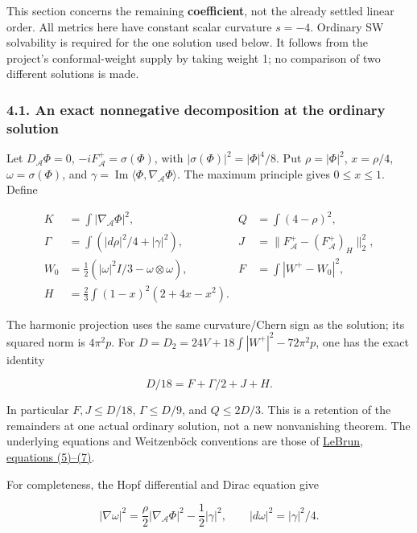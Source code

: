 \documentclass[
  10pt,
]{article}
\begin{document}
This section concerns the remaining \textbf{coefficient}, not the
already settled linear order. All metrics here have constant scalar
curvature \(s=-4\). Ordinary SW solvability is required for the one
solution used below. It follows from the project's conformal-weight
supply by taking weight 1; no comparison of two different solutions is
made.

\hypertarget{an-exact-nonnegative-decomposition-at-the-ordinary-solution}{%
\subsubsection{4.1. An exact nonnegative decomposition at the ordinary
solution}\label{an-exact-nonnegative-decomposition-at-the-ordinary-solution}}

Let \(D_{\mathcal A}\Phi=0\), \(-iF_{\mathcal A}^+=\sigma(\Phi)\), with
\(|\sigma(\Phi)|^2=|\Phi|^4/8\). Put \(\rho=|\Phi|^2\), \(x=\rho/4\),
\(\omega=\sigma(\Phi)\), and
\(\gamma=\operatorname{Im}\langle\Phi,\nabla_{\mathcal A}\Phi\rangle\).
The maximum principle gives \(0\le x\le1\). Define

\[
 \begin{aligned}
 K&=\int|\nabla_{\mathcal A}\Phi|^2,&Q&=\int(4-\rho)^2,\\
 \Gamma&=\int(|d\rho|^2/4+|\gamma|^2),&
 J&=\|F_{\mathcal A}^+-(F_{\mathcal A}^+)_H\|_2^2,\\
 W_0&=\tfrac12(|\omega|^2I/3-\omega\otimes\omega),&
 F&=\int|W^+-W_0|^2,\\
 H&=\tfrac23\int(1-x)^2(2+4x-x^2).&&
 \end{aligned}                                                   \tag{4.1}
\]

The harmonic projection uses the same curvature/Chern sign as the
solution; its squared norm is \(4\pi^2p\). For
\(D=D_2=24V+18\int|W^+|^2-72\pi^2p\), one has the exact identity

\[
                  \boxed{D/18=F+\Gamma/2+J+H.}                  \tag{4.2}
\]

In particular \(F,J\le D/18\), \(\Gamma\le D/9\), and \(Q\le2D/3\). This
is a retention of the remainders at one actual ordinary solution, not a
new nonvanishing theorem. The underlying equations and Weitzenböck
conventions are those of
\href{https://arxiv.org/pdf/math/0003068}{LeBrun, equations (5)--(7)}.

For completeness, the Hopf differential and Dirac equation give

\[
 |\nabla\omega|^2=\frac\rho2|\nabla_{\mathcal A}\Phi|^2
                                      -\frac12|\gamma|^2,
 \qquad |d\omega|^2=|\gamma|^2/4.                  \tag{4.3}
\]
\end{document}
